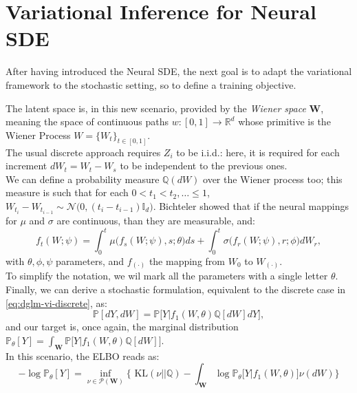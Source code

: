 \documentclass[11pt]{article}
\begin{document}
\section{Variational Inference for Neural SDE}
\label{sec:vi}
After having introduced the Neural SDE, the next goal is to adapt the variational framework to the stochastic setting, so to define a training objective. 

The latent space is, in this new scenario, provided by the \textit{Wiener space} $\mathbf{W}$, meaning the space of continuous paths $w: [0, 1] \rightarrow \mathbb{R}^d$ whose primitive is the Wiener Process $W = \{W_t \}_{t \in [0,1]}$. \\ 
The usual discrete approach requires $Z_i$ to be i.i.d.: here, it is required for each increment $dW_t = W_t-W_s$ to be independent to the previous ones. \\ 
We can define a probability measure $\mathbb{Q}(dW)$ over the Wiener process too; this measure is such that for each $0 < t_1 < t_2, \dots \leq 1$, $W_{t_i}-W_{t_{i-1}} \sim \mathcal{N}\big(0, (t_i-t_{i-1})\mathbb{I}_d \big)$.
Bichteler \cite{bichteler2002stochastic}
showed that if the neural mappings for $\mu$ and $\sigma$ are continuous, than they are measurable, and:
\begin{equation}
  f_t(W;\psi) = \int_0^t \mu\big(f_s(W;\psi),s;\theta \big) ds + \int_0^t \sigma\big(f_r(W; \psi),r; \phi \big) dW_r, \label{eq:vi-path}
\end{equation} 
with $\theta, \phi, \psi$ parameters, and $f_{(\cdot)}$ the mapping from $W_0$ to $W_{(\cdot)}$. \\
To simplify the notation, we wil mark all the parameters with a single letter $\theta$. 
Finally, we can derive a stochastic formulation, equivalent to the discrete case in \ref{eq:dglm-vi-discrete}, as:
\begin{equation}
  \mathbb{P}[dY, dW] = \mathbb{P}\big[Y | f_1(W, \theta) \mathbb{Q}[dW]dY \big], \label{eq:vi-stochastic}
\end{equation}
and our target is, once again, the marginal distribution $\mathbb{P}_\theta[Y] = \int_{\mathbf{W}}\mathbb{P}\big[Y | f_1(W, \theta) \mathbb{Q}[dW]\big]  $. \\ 
In this scenario, the ELBO reads as:
\begin{equation}
  - \log \mathbb{P}_\theta[Y] = \inf_{\nu \in \mathcal{P}(\mathbf{W})} \big\{\text{ KL}(\nu || \mathbb{Q}) - \int_{\mathbf{W}} \log \mathbb{P}_\theta \big[Y | f_1(W, \theta)\big] \nu(dW)   \big \} \label{eq:vi-elbo}
\end{equation}
\end{document}
